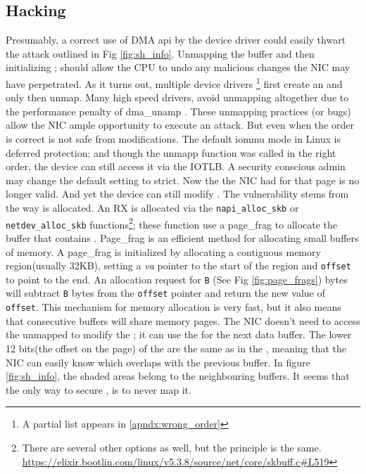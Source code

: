 \subsection{Hacking \shinfo}\label{sec:shinfo}
Presumably, a correct use of DMA api by the device driver could easily thwart the attack outlined in Fig \ref{fig:sh_info}. Unmapping the buffer and then initializing \shinfo; should allow the CPU to undo any malicious changes the NIC may have perpetrated. As it turns out, multiple device drivers \footnote{A partial list appears in \ref{apndx:wrong_order}} first create an \skb and only then unmap. Many high speed drivers, avoid unmapping altogether due to the performance penalty of dma\_unamp \cite{MMT16,MSMT18}. These unmapping practices (or bugs) allow the NIC ample opportunity to execute an attack. But even when the order is correct \shinfo is not safe from modifications. The default iommu mode in Linux is deferred protection; and though the unmapp function was called in the right order, the device can still access it via the IOTLB. A security conscious admin may change the default setting to strict. Now the \iova the NIC had for that page is no longer valid. And yet the device can still modify \shinfo. The vulnerability stems from the way \data is allocated. An RX \skb is allocated via the \texttt{napi\_alloc\_skb} or \texttt{netdev\_alloc\_skb} functions\footnote{There are several other options as well, but the principle is the same. \url{https://elixir.bootlin.com/linux/v5.3.8/source/net/core/skbuff.c\#L519}}; these function use a page\_frag to allocate the \data buffer that contains \shinfo. Page\_frag is an efficient method for allocating small buffers of memory. A page\_frag is initialized by allocating a contiguous memory region(usually 32KB), setting a \textit{va} pointer to the start of the region and \texttt{offset} to point to the end. An allocation request for \texttt{B} (See Fig \ref{fig:page_frags}) bytes will subtract \texttt{B} bytes from the \texttt{offset} pointer and return the new value of  \texttt{offset}. 
This mechanism for memory allocation is very fast, but it also means that consecutive \data buffers will share memory pages. The NIC doesn't need to access the unmapped \iova to modify the \shinfo; it can use the \iova for the next data buffer. The lower 12 bits(the offset on the page) of the \iova  are the same as in the \kva, meaning that the NIC can easily know which \iova overlaps with the previous buffer. In figure \ref{fig:sh_info}, the shaded areas belong to the neighbouring \data buffers. It seems that the only way to secure \shinfo, is to never map it\cite{MSMT18}.
